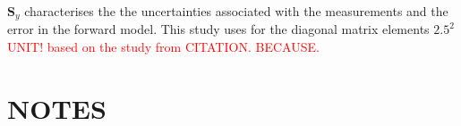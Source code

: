 $\mathbf{S}_y$ characterises the the uncertainties associated with the measurements and the error in the forward model. This study uses for the diagonal matrix elements $2.5^2$ \textcolor{red}{UNIT! based on the study from CITATION. BECAUSE.}

\section{NOTES}
